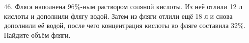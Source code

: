 46. Фляга наполнена $96\%$-ным раствором соляной кислоты. Из неё отлили 12 л кислоты и дополнили флягу водой. Затем из фляги отлили ещё 18 л и снова дополнили её водой, после чего концентрация кислоты во фляге составила $32\%.$ Найдите объём фляги.\\
